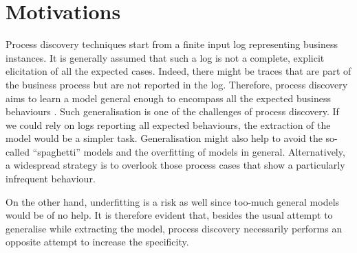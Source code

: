 
\section{Motivations}
\label{sec:motivations}
Process discovery techniques start from a finite input log representing business instances. It is generally assumed that such a log is not a complete, explicit elicitation of all the expected cases. Indeed, there might be traces that are part of the business process but are not reported in the log.
Therefore, process discovery aims to learn a model general enough to encompass all the expected business behaviours \cite{2011-Aalst}.
%
Such generalisation is one of the challenges of process discovery. If we could rely on logs reporting all expected behaviours, the extraction of the model would be a simpler task.
%
Generalisation might also help to avoid the so-called ``spaghetti'' models and the overfitting of models in general\cite{2010-Aalst}. Alternatively, a widespread strategy is to overlook those process cases that show a particularly infrequent behaviour. 

On the other hand, underfitting is a risk as well since too-much general models would be of no help.
It is therefore evident that, besides the usual attempt to generalise while extracting the model, process discovery necessarily performs an opposite attempt to increase the specificity.



